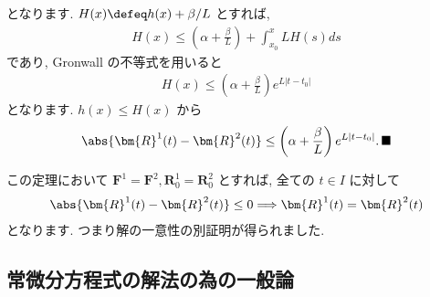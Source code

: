 \documentclass[openany, a4paper, oneside]{jsbook}
\begin{document}
となります.
$H (x) \defeq h (x) + \beta / L$ とすれば,
\begin{gather}
H (x)
\leq
\left ( \alpha + \frac{\beta} {L} \right) + \int_{x_0}^x L H (s) ds
\end{gather}
であり, Gronwall の不等式を用いると
\begin{gather}
H (x)
\leq
\left ( \alpha + \frac{\beta} {L} \right) e^{ L| t - t_0 | }
\end{gather}
となります.
$h (x) \leq H (x)$ から
\begin{gather}
\abs{\bm{R}^1 (t) - \bm{R}^2 (t)}
\leq
\left ( \alpha + \frac{\beta} {L} \right) e^{ L| t - t_0 | } . \, \blacksquare
\end{gather}

この定理において $\bm{F}^1 = \bm{F}^2 ,\bm{R}^1_0 =\bm{R}^2_0$ とすれば,
全ての $t \in I$ に対して
\begin{gather}
\abs{\bm{R}^1 (t) - \bm{R}^2 (t)} \leq 0
\Longrightarrow
\bm{R}^1 (t)
=
\bm{R}^2 (t)
\end{gather}
となります.
つまり解の一意性の別証明が得られました.
\subsection{常微分方程式の解法の為の一般論}
\end{document}
